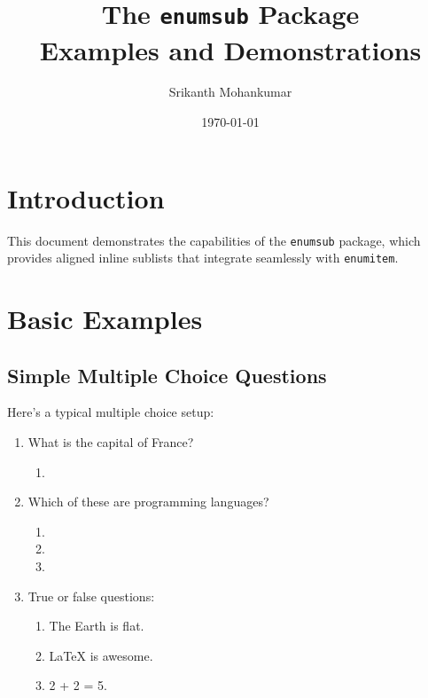 \documentclass[11pt]{article}
\title{The \texttt{enumsub} Package\\Examples and Demonstrations}
\author{Srikanth Mohankumar}
\date{\today}
\begin{document}
\maketitle

\section{Introduction}

This document demonstrates the capabilities of the \texttt{enumsub} package, 
which provides aligned inline sublists that integrate seamlessly with 
\texttt{enumitem}.

\section{Basic Examples}

\subsection{Simple Multiple Choice Questions}

Here's a typical multiple choice setup:

\begin{enumerate}[mainq]
  \item What is the capital of France?
  \begin{enumerate}[subq]
    \item {}
  \end{enumerate}
  
  \item Which of these are programming languages?
  \begin{enumerate}[subq]
    \item {}
    \item {}
    \item {}
  \end{enumerate}
  
  \item True or false questions:
  \begin{enumerate}[subq]
    \item The Earth is flat. 
    \item LaTeX is awesome. 
    \item 2 + 2 = 5. 
  \end{enumerate}
\end{enumerate}
\end{document}
